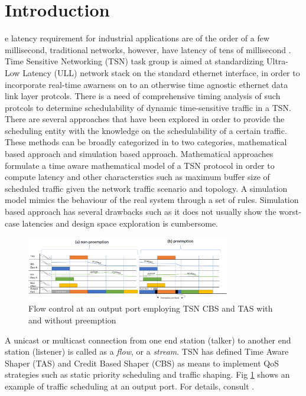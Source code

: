 \documentclass[journal,12pt,twocolumn]{IEEEtran}
\begin{document}
\section{Introduction}
% 
% 
% 
% 
e latency requirement for industrial applications are of the order of a few millisecond, traditional networks, however, have latency of tens of millisecond \cite{LATENCY}.  Time Sensitive Networking (TSN) task group \cite{TSN} is aimed at standardizing Ultra-Low Latency (ULL) network stack on the standard ethernet interface, in order to incorporate real-time awarness on to an otherwise time agnostic ethernet data link layer protcols. There is a need of comprehensive timing analysis of such protcols to determine schedulability of dynamic time-sensitive traffic in a TSN.  There are several approaches that have been explored in order to provide the scheduling entity with the knowledge on the schedulability of a certain traffic. These methods can be broadly categorized in to two categories, mathematical based approach and simulation based approach. Mathematical approaches formulate a time aware mathematical model of a TSN protocol in order to compute latency and other characterstics such as maximum buffer size of scheduled traffic given the network traffic scenario and topology. A simulation model mimics the behaviour of the real system through a set of rules. Simulation based approach has several drawbacks such as it does not usually show the worst-case latencies and design space exploration is cumbersome. 

\begin{figure}
\centering
\includegraphics[width=3.5in]{TSNFlowControl}
\caption{Flow control at an output port employing TSN CBS and TAS with and without preemption}
\label{TSN_FlowControl}
\end{figure}
A unicast or multicast connection from one end station (talker) to another end station (listener) is called as a \emph {flow}, or a \emph {stream}. TSN has defined Time Aware Shaper (TAS) \cite{IEEE802.1Qbv} and Credit Based Shaper (CBS) \cite{IEEE802.1Qav} as means to implement QoS strategies such as static priority scheduling and traffic shaping. Fig \ref{TSN_FlowControl} shows an example of traffic scheduling at an output port. For details, consult \cite{ULL}.
\end{document}

